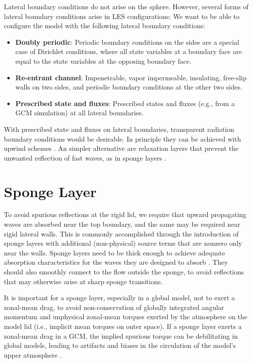 \documentclass{report}
\begin{document}
Lateral boundary conditions do not arise on the sphere. However, several forms of lateral boundary conditions arise in LES configurations: We want to be able to configure the model with the following lateral boundary conditions:
\begin{itemize}
    \item \textbf{Doubly periodic}: Periodic boundary conditions on the sides are a special case of Dirichlet conditions, where all state variables at a boundary face are equal to the state variables at the opposing boundary face.
    \item \textbf{Re-entrant channel}: Impenetrable, vapor impermeable, insulating, free-slip walls on two sides, and periodic boundary conditions at the other two sides. 
    \item \textbf{Prescribed state and fluxes}: Prescribed states and fluxes (e.g., from a GCM simulation) at all lateral boundaries. 
\end{itemize}
With prescribed state and fluxes on lateral boundaries, transparent radiation boundary conditions would be desirable. In principle they can be achieved with upwind schemes \citep{Davies14a}. An simpler alternative are relaxation layers that prevent the unwanted reflection of fast waves, as in sponge layers \citep{Davies76a}.

\section{Sponge Layer}\label{s:sponge}

To avoid spurious reflections at the rigid lid, we require that upward propagating waves are absorbed near the top boundary, and the same may be required near rigid lateral walls. This is commonly accomplished through the introduction of sponge layers with additional (non-physical) source terms that are nonzero only near the walls. Sponge layers need to be thick enough to achieve adequate absorption characteristics for the waves they are designed to absorb \citep{durran:1983}. They should also smoothly connect to the flow outside the sponge, to avoid reflections that may otherwise arise at sharp sponge transitions. 

It is important for a sponge layer, especially in a global model, not to exert a zonal-mean drag, to avoid non-conservation of globally integrated angular momentum and unphysical zonal-mean torques exerted by the atmosphere on the model lid (i.e., implicit mean torques on outer space). If a sponge layer exerts a zonal-mean drag in a GCM, the implied spurious torque can be debilitating in global models, leading to artifacts and biases in the circulation of the model's upper atmosphere \citep[e.g.,][]{Shepherd96a}. 
\end{document}
